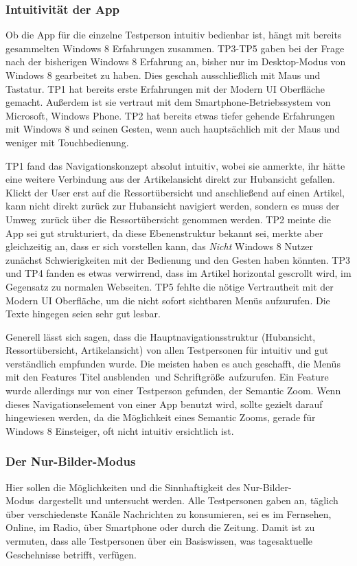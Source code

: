 \documentclass[12pt,a4paper,bibtotoc,abstracton]{scrartcl}
\begin{document}
\subsubsection{Intuitivität der App} 
\label{subsubsec:intuitivitätderapp}
Ob die App für die einzelne Testperson intuitiv bedienbar ist, hängt mit bereits gesammelten Windows 8 Erfahrungen zusammen. TP3-TP5 gaben bei der Frage nach der bisherigen Windows 8 Erfahrung an, bisher nur im Desktop-Modus von Windows 8 gearbeitet zu haben. Dies geschah ausschließlich mit Maus und Tastatur. TP1 hat bereits erste Erfahrungen mit der Modern UI Oberfläche gemacht. Außerdem ist sie vertraut mit dem Smartphone-Betriebssystem von Microsoft, Windows Phone. TP2 hat bereits etwas tiefer gehende Erfahrungen mit Windows 8 und seinen Gesten, wenn auch hauptsächlich mit der Maus und weniger mit Touchbedienung.

TP1 fand das Navigationskonzept \glqq absolut intuitiv\grqq, wobei sie anmerkte, ihr hätte eine weitere Verbindung aus der Artikelansicht direkt zur Hubansicht gefallen. Klickt der User erst auf die Ressortübersicht und anschließend auf einen Artikel, kann nicht direkt zurück zur Hubansicht navigiert werden, sondern es muss der \glqq Umweg\grqq\ zurück über die Ressortübersicht genommen werden. TP2 meinte die App sei gut strukturiert, da diese Ebenenstruktur bekannt sei, merkte aber gleichzeitig an, dass er sich vorstellen kann, das \emph{Nicht} Windows 8 Nutzer zunächst Schwierigkeiten mit der Bedienung und den Gesten haben könnten. TP3 und TP4 fanden es etwas verwirrend, dass im Artikel horizontal gescrollt wird, im Gegensatz zu normalen Webseiten. TP5 \glqq fehlte die nötige Vertrautheit mit der Modern UI Oberfläche\grqq, um die nicht sofort sichtbaren Menüs aufzurufen. Die Texte hingegen seien sehr gut lesbar.

Generell lässt sich sagen, dass die Hauptnavigationsstruktur (Hubansicht, Ressortübersicht, Artikelansicht) von allen Testpersonen für intuitiv und gut verständlich empfunden wurde. Die meisten haben es auch geschafft, die Menüs mit den Features \glqq Titel ausblenden\grqq\ und \glqq Schriftgröße\grqq\ aufzurufen. Ein Feature wurde allerdings nur von einer Testperson gefunden, der \glqq Semantic Zoom\grqq. Wenn dieses Navigationselement von einer App benutzt wird, sollte gezielt darauf hingewiesen werden, da die Möglichkeit eines \glqq Semantic Zooms\grqq, gerade für Windows 8 Einsteiger, oft nicht intuitiv ersichtlich ist.

\subsubsection{Der Nur-Bilder-Modus}
\label{subsubsec:nurbildermodus}
Hier sollen die Möglichkeiten und die Sinnhaftigkeit des \glqq Nur-Bilder-Modus\grqq\  dargestellt und untersucht werden. Alle Testpersonen gaben an, täglich über verschiedenste Kanäle Nachrichten zu konsumieren, sei es im Fernsehen, Online, im Radio, über Smartphone oder durch die Zeitung. Damit ist zu vermuten, dass alle Testpersonen über ein Basiswissen, was tagesaktuelle Geschehnisse betrifft, verfügen.
\end{document}
